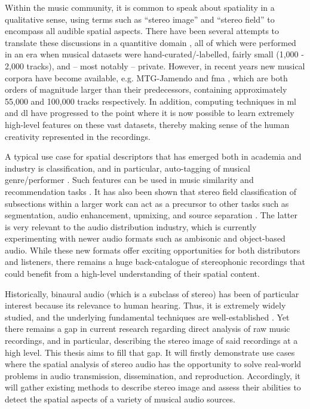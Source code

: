 \documentclass[a4paper]{article}
\begin{document}
Within the music community, it is common to speak about spatiality in a qualitative sense, using terms such as \enquote{stereo image} and \enquote{stereo field} to encompass all audible spatial aspects. There have been several attempts to translate these discussions in a quantitive domain \cite{tzanetakisStereoPanningFeatures2007,dewhirstModellingPerceivedSpatial2008,sarroffMeasurementsSpaciousnessStereophonic2008,tardieuProductionEffectAudio2011}, all of which were performed in an era when musical datasets were hand-curated/-labelled, fairly small (1,000 - 2,000 tracks), and -- most notably -- private. However, in recent years new musical corpora have become available, e.g. MTG-Jamendo \cite{bogdanovMTGJamendoDatasetAutomatic2019} and \gls{fma} \cite{defferrardFMADatasetMusic2017}, which are both orders of magnitude larger than their predecessors, containing approximately 55,000 and 100,000 tracks respectively. In addition, computing techniques in \gls{ml} and \gls{dl} have progressed to the point where it is now possible to learn extremely high-level features on these vast datasets, thereby making sense of the human creativity represented in the recordings. 

A typical use case for spatial descriptors that has emerged both in academia and industry is classification, and in particular, auto-tagging of musical genre/performer \cite{tzanetakisStereoPanningInformation2010,ziemerGoniometersArePowerful2023}. Such features can be used in music similarity and recommendation tasks \cite{gomezMusicSimilaritySystems2008,ziemerNovelRecordingStudio2020}. It has also been shown that stereo field classification of subsections within a larger work can act as a precursor to other tasks such as segmentation, audio enhancement, upmixing, and source separation \cite{barryMusicStructureSegmentation2007,harmaStereoAudioClassification2011,harmaClassificationTimefrequencyRegions2011}. The latter is very relevant to the audio distribution industry, which is currently experimenting with newer audio formats such as ambisonic and object-based audio. While these new formats offer exciting opportunities for both distributors and listeners, there remains a huge back-catalogue of stereophonic recordings that could benefit from a high-level understanding of their spatial content. 

Historically, binaural audio (which is a subclass of stereo) has been of particular interest because its relevance to human hearing. Thus, it is extremely widely studied, and the underlying fundamental techniques are well-established \cite{blauertTechnologyBinauralListening2013}. Yet there remains a gap in current research regarding direct analysis of raw music recordings, and in particular, describing the stereo image of said recordings at a high level. This thesis aims to fill that gap. It will firstly demonstrate use cases where the spatial analysis of stereo audio has the opportunity to solve real-world problems in audio transmission, dissemination, and reproduction. Accordingly, it will gather existing methods to describe stereo image and assess their abilities to detect the spatial aspects of a variety of musical audio sources.
\end{document}
